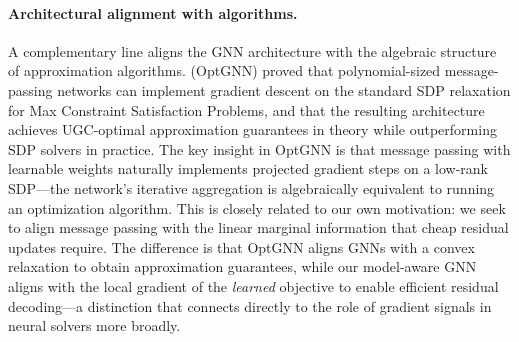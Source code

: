 \documentclass[11pt]{article}
\newcommand{\change}[1]{{\color{red}#1}}
\theoremstyle{plain}
\theoremstyle{definition}
\theoremstyle{remark}
\begin{document}
\paragraph{Architectural alignment with algorithms.}
\change{A complementary line} aligns the GNN architecture with the algebraic
structure of approximation algorithms. \citet{yau2023} (OptGNN) proved that
polynomial-sized message-passing networks can implement gradient descent on the
standard SDP relaxation for Max Constraint Satisfaction Problems, and that the
resulting architecture achieves UGC-optimal approximation guarantees in theory while
outperforming SDP solvers in practice. The key insight in OptGNN is that message
passing with learnable weights naturally implements projected gradient steps on a
low-rank SDP---the network's iterative aggregation is algebraically equivalent to
running an optimization algorithm. This is closely related to our own motivation: we
seek to align message passing with the linear marginal information that cheap
residual updates require. The difference is that OptGNN aligns GNNs with a convex
relaxation to obtain approximation guarantees, while our model-aware GNN aligns with
the local gradient of the \emph{learned} objective to enable efficient residual
decoding\change{---a distinction that connects directly to the role of gradient signals in neural solvers more broadly}.
\end{document}
